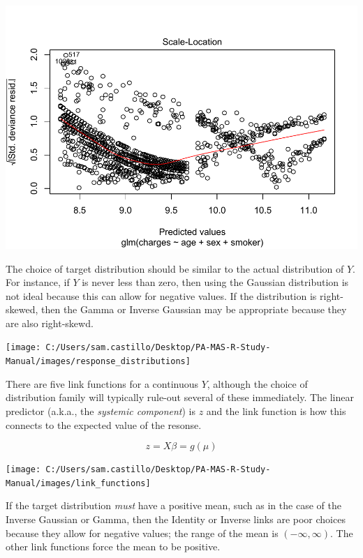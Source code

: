 \documentclass[
  openany]{book}
\begin{document}
\begin{center}\includegraphics{05-linear-models_files/figure-latex/unnamed-chunk-17-1} \end{center}

The choice of target distribution should be similar to the actual distribution of \(Y\). For instance, if \(Y\) is never less than zero, then using the Gaussian distribution is not ideal because this can allow for negative values. If the distribution is right-skewed, then the Gamma or Inverse Gaussian may be appropriate because they are also right-skewd.

\begin{center}\texttt{[image: C:/Users/sam.castillo/Desktop/PA-MAS-R-Study-Manual/images/response\_distributions]} \end{center}

There are five link functions for a continuous \(Y\), although the choice of distribution family will typically rule-out several of these immediately. The linear predictor (a.k.a., the \emph{systemic component}) is \(z\) and the link function is how this connects to the expected value of the resonse.

\[z = X\beta = g(\mu)\]

\begin{center}\texttt{[image: C:/Users/sam.castillo/Desktop/PA-MAS-R-Study-Manual/images/link\_functions]} \end{center}

If the target distribution \emph{must} have a positive mean, such as in the case of the Inverse Gaussian or Gamma, then the Identity or Inverse links are poor choices because they allow for negative values; the range of the mean is \((-\infty, \infty)\). The other link functions force the mean to be positive.
\end{document}
